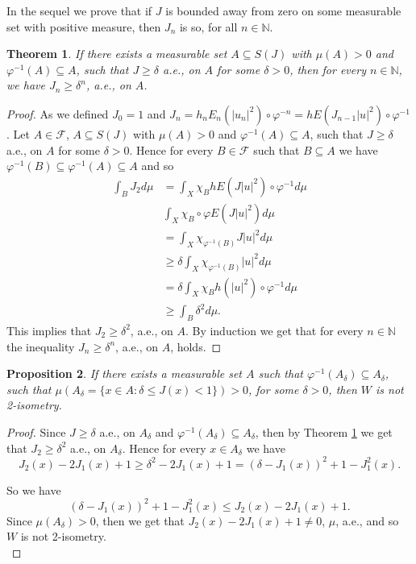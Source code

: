 \documentclass{amsart}
\newtheorem{thm}{Theorem}[section]
\newtheorem{cor}[thm]{Corollary}
\newtheorem{prop}[thm]{Proposition}
\theoremstyle{definition}\newtheorem{defn}[thm]{Definition}
\theoremstyle{remark}
\numberwithin{equation}{section}
\begin{document}
In the sequel we prove that if $J$ is bounded away from zero on some measurable set with positive measure, then $J_n$ is so, for all $n\in \mathbb{N}$.
\begin{thm}\label{t1.3}
If there exists a measurable set $A\subseteq S(J)$ with $\mu(A)>0$ and $\varphi^{-1}(A)\subseteq A$, such that $J\geq \delta$ a.e., on $A$ for some $\delta>0$, then for every $n\in\mathbb{N}$, we have $J_n\geq \delta^n$, a.e., on $A$.
\end{thm}
\begin{proof}
As we defined $J_0=1$ and $J_n=h_nE_n(|u_n|^2)\circ\varphi^{-n}=hE(J_{n-1}|u|^2)\circ\varphi^{-1}$. Let $A\in \mathcal{F}$, $A\subseteq S(J)$ with $\mu(A)>0$ and $\varphi^{-1}(A)\subseteq A$, such that $J\geq \delta$ a.e., on $A$ for some $\delta>0$. Hence for every $B\in \mathcal{F}$ such that $B\subseteq A$ we have $\varphi^{-1}(B)\subseteq \varphi^{-1}(A)\subseteq A$ and so 
\begin{align*}
\int_BJ_2d\mu&=\int_X\chi_BhE(J|u|^2)\circ\varphi^{-1}d\mu\\
&\int_X\chi_B\circ\varphi E(J|u|^2)d\mu\\
&=\int_X\chi_{\varphi^{-1}(B)} J|u|^2d\mu\\
&\geq \delta\int_X\chi_{\varphi^{-1}(B)}|u|^2d\mu\\
&=\delta\int_X\chi_Bh(|u|^2)\circ\varphi^{-1}d\mu\\
&\geq \int_B\delta^2d\mu.
\end{align*}
This implies that $J_2\geq \delta^2$, a.e., on $A$. By induction we get that for every $n\in\mathbb{N}$ the inequality $J_n\geq \delta^n$, a.e., on $A$, holds.
\end{proof}
\begin{prop}
If there exists a measurable set $A$ such that $\varphi^{-1}(A_{\delta})\subseteq A_{\delta}$, such that $\mu(A_{\delta}=\{x\in A: \delta\leq J(x)<1\})>0$, for some $\delta>0$, then $W$ is not 2-isometry. 
\end{prop}
\begin{proof} Since $J\geq \delta$ a.e., on $A_{\delta}$ and $\varphi^{-1}(A_{\delta})\subseteq A_{\delta}$, then by Theorem \ref{t1.3} we get that $J_2\geq\delta^2$ a.e., on $A_{\delta}$. Hence for every $x\in A_{\delta}$ we have
$$J_2(x)-2J_1(x)+1\geq \delta^2-2J_1(x)+1=(\delta-J_1(x))^2+1-J^2_1(x).$$

So we have 
$$(\delta-J_1(x))^2+1-J^2_1(x)\leq J_2(x)-2J_1(x)+1.$$
Since $\mu(A_{\delta})>0$, then we get that $J_2(x)-2J_1(x)+1\neq 0$, $\mu$, a.e., and so $W$ is not 2-isometry.\\
\end{proof}
\end{document}
